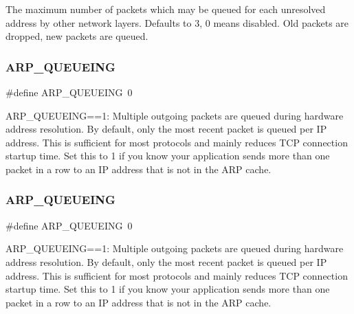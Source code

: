 The maximum number of packets which may be queued for each unresolved address by other network layers. Defaults to 3, 0 means disabled. Old packets are dropped, new packets are queued. \mbox{\label{group__lwip__opts__arp_ga75837814536af29b6102508588d0ab58}} 
\subsubsection{\texorpdfstring{A\+R\+P\+\_\+\+Q\+U\+E\+U\+E\+I\+NG}{ARP\_QUEUEING}\hspace{0.1cm}{\footnotesize\ttfamily [1/2]}}
{\footnotesize\ttfamily \#define A\+R\+P\+\_\+\+Q\+U\+E\+U\+E\+I\+NG~0}

A\+R\+P\+\_\+\+Q\+U\+E\+U\+E\+I\+NG==1\+: Multiple outgoing packets are queued during hardware address resolution. By default, only the most recent packet is queued per IP address. This is sufficient for most protocols and mainly reduces T\+CP connection startup time. Set this to 1 if you know your application sends more than one packet in a row to an IP address that is not in the A\+RP cache. \mbox{\label{group__lwip__opts__arp_ga75837814536af29b6102508588d0ab58}} 
\subsubsection{\texorpdfstring{A\+R\+P\+\_\+\+Q\+U\+E\+U\+E\+I\+NG}{ARP\_QUEUEING}\hspace{0.1cm}{\footnotesize\ttfamily [2/2]}}
{\footnotesize\ttfamily \#define A\+R\+P\+\_\+\+Q\+U\+E\+U\+E\+I\+NG~0}

A\+R\+P\+\_\+\+Q\+U\+E\+U\+E\+I\+NG==1\+: Multiple outgoing packets are queued during hardware address resolution. By default, only the most recent packet is queued per IP address. This is sufficient for most protocols and mainly reduces T\+CP connection startup time. Set this to 1 if you know your application sends more than one packet in a row to an IP address that is not in the A\+RP cache. \mbox{\label{group__lwip__opts__arp_ga924936a814564dbdb0bc950d255a83b9}} 

